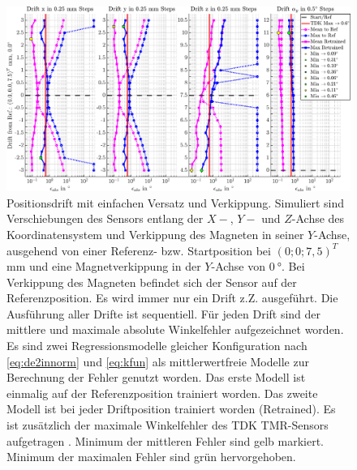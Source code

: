\clearpage
\begin{landscape}
\begin{figure}[tbph]
	\centering
	\includegraphics[width=.8\linewidth]{chapters/images/4-EuOExp/Drift-Model-Errors}
	\caption[Positionsdrift mit einfachen Versatz und Verkippung]{Positionsdrift mit einfachen Versatz und Verkippung. Simuliert sind Verschiebungen des Sensors entlang der $X-$, $Y-$ und $Z$-Achse des Koordinatensystem und Verkippung des Magneten in seiner $Y$-Achse, ausgehend von einer Referenz- bzw. Startposition bei $(0;0;7,5)^T$ mm und eine Magnetverkippung in der $Y$-Achse von $\SI{0}{\degree}$. Bei Verkippung des Magneten befindet sich der Sensor auf der Referenzposition. Es wird immer nur ein Drift z.Z. ausgeführt. Die Ausführung aller Drifte ist sequentiell. Für jeden Drift sind der mittlere und maximale absolute Winkelfehler aufgezeichnet worden. Es sind zwei Regressionsmodelle gleicher Konfiguration nach \autoref{eq:de2innorm} und \autoref{eq:kfun} als mittlerwertfreie Modelle zur Berechnung der Fehler genutzt worden. Das erste Modell ist einmalig auf der Referenzposition trainiert worden. Das zweite Modell ist bei jeder Driftposition trainiert worden (Retrained). Es ist zusätzlich der maximale Winkelfehler des TDK TMR-Sensors aufgetragen \cite{TDK2016}. Minimum der mittleren Fehler sind gelb markiert. Minimum der maximalen Fehler sind grün hervorgehoben.}
	\label{fig:drift-model-errors}
\end{figure}
\end{landscape}


